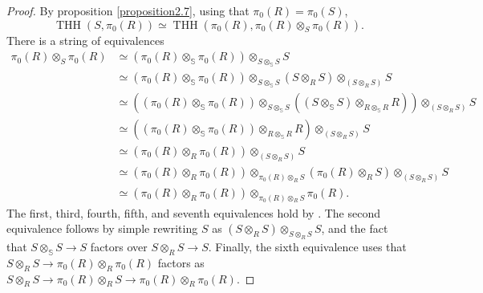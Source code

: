 \documentclass[11pt,leqno]{article}
\newcommand{\sss}{\mathbb{S}}
\DeclareMathOperator{\THH}{THH}
\newtheorem*{short hand}{theorem name}
\theoremstyle{plain}  %
\theoremstyle{definition}
\numberwithin{equation}{section}
\begin{document}
\begin{proof}
By proposition \ref{proposition2.7}, using that $\pi_0(R)=\pi_0(S)$, $$\THH(S,\pi_0(R))\simeq \THH(\pi_0(R),\pi_0(R)\otimes_{S}\pi_0(R)).$$ There is a string of equivalences
\begin{align*}
\pi_0(R)\otimes_{S}\pi_0(R)&\simeq (\pi_0(R)\otimes_{\sss}\pi_0(R)) \otimes_{S\otimes_{\sss}S} S\\
&\simeq (\pi_0(R)\otimes_{\sss}\pi_0(R)) \otimes_{S\otimes_{\sss}S} (S\otimes_{R} S)\otimes_{(S\otimes_{R} S)}S\\
&\simeq ((\pi_0(R)\otimes_{\sss}\pi_0(R)) \otimes_{S\otimes_{\sss}S} ((S\otimes_{\sss}S)\otimes_{R\otimes_{\sss}R}R))\otimes_{(S\otimes_{R} S)}S\\
&\simeq  ((\pi_0(R)\otimes_{\sss}\pi_0(R)) \otimes_{R\otimes_{\sss}R} R)\otimes_{(S\otimes_{R} S)}S\\
&\simeq (\pi_0(R)\otimes_R \pi_0(R))\otimes_{(S\otimes_{R} S)}S\\
&\simeq (\pi_0(R)\otimes_R \pi_0(R))\otimes_{\pi_0(R)\otimes_{R} S}(\pi_0(R)\otimes_{R} S)\otimes_{(S\otimes_{R} S)}S\\
&\simeq (\pi_0(R)\otimes_R \pi_0(R))\otimes_{\pi_0(R)\otimes_{R} S} \pi_0(R).
\end{align*}
The first, third, fourth, fifth, and seventh equivalences hold by \cite[~Theorem 5.1.4.10]{HA}. The second equivalence follows by simple rewriting $S$ as $(S\otimes_{R}S)\otimes_{S\otimes_{R}S}S$, and the fact that $S\otimes_{\sss}S\to S$ factors over $S\otimes_{R}S\to S$.  Finally, the sixth equivalence uses that $S\otimes_{R}S\to \pi_0(R)\otimes_{R}\pi_0(R)$ factors as $S\otimes_{R}S\to \pi_0(R)\otimes_{R}S\to \pi_0(R)\otimes_{R}\pi_0(R)$. 


\end{proof}
\end{document}
